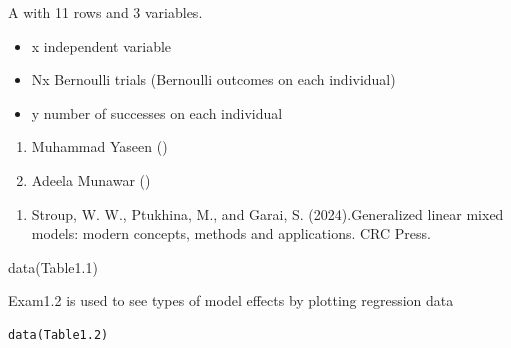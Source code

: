 \documentclass[a4paper]{book}
\begin{document}
%
\begin{Format}
A  with 11 rows and 3 variables.
\end{Format}
%
\begin{Details}
\begin{itemize}

\item{} x independent variable
\item{} Nx Bernoulli trials (Bernoulli outcomes on each individual)
\item{} y number of successes on each individual

\end{itemize}

\end{Details}
%
\begin{Author}
\begin{enumerate}

\item{} Muhammad Yaseen ()
\item{} Adeela Munawar ()

\end{enumerate}

\end{Author}
%
\begin{References}
\begin{enumerate}

\item{} Stroup, W. W., Ptukhina, M., and Garai, S. (2024).Generalized linear mixed models: modern concepts, methods and applications.
CRC Press.

\end{enumerate}

\end{References}
%
\begin{Examples}
\begin{ExampleCode}
data(Table1.1)
\end{ExampleCode}
\end{Examples}
%
\begin{Description}
Exam1.2 is used to see types of model effects by plotting regression data
\end{Description}
%
\begin{Usage}
\begin{verbatim}
data(Table1.2)
\end{verbatim}
\end{Usage}
\end{document}
